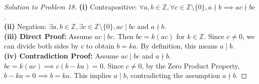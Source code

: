 \documentclass{article}
\begin{document}
\begin{proof}[Solution to Problem 18]
\textbf{(i)} Contrapositive: $\forall a,b \in \mathbb{Z}, \forall c \in \mathbb{Z} \setminus \{0\}, a \nmid b \implies ac \nmid bc$. \\
\textbf{(ii)} Negation: $\exists a,b \in \mathbb{Z}, \exists c \in \mathbb{Z} \setminus \{0\}, ac \mid bc \text{ and } a \nmid b$. \\
\textbf{(iii) Direct Proof:} Assume $ac \mid bc$. Then $bc = k(ac)$ for $k \in \mathbb{Z}$. Since $c \neq 0$, we can divide both sides by $c$ to obtain $b = ka$. By definition, this means $a \mid b$. \\
\textbf{(iv) Contradiction Proof:} Assume $ac \mid bc$ and $a \nmid b$. $bc = k(ac) \implies c(b - ka) = 0$. Since $c \neq 0$, by the Zero Product Property, $b - ka = 0 \implies b = ka$. This implies $a \mid b$, contradicting the assumption $a \nmid b$.
\end{proof}
\end{document}
